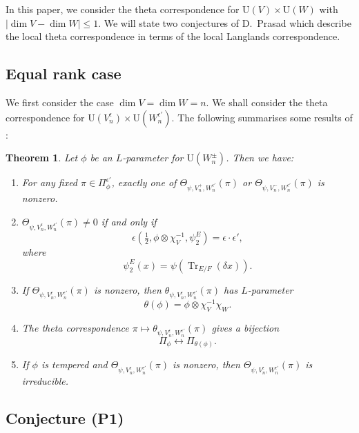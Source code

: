 \documentclass[11pt]{amsart}
\numberwithin{equation}{section}
\theoremstyle{plain}
\newtheorem{thm}{Theorem}[section]
\theoremstyle{definition}
\theoremstyle{remark}
\def\Tr{\operatorname{Tr}}
\def\U{\mathrm{U}}
\begin{document}
In this paper, we consider the theta correspondence for $\U(V) \times \U(W)$ with $|\dim V - \dim W| \le 1$. We will state two conjectures of D.~Prasad which describe the local theta correspondence in terms of the local Langlands correspondence. 

\subsection{Equal rank case} 

We first consider the case $\dim V = \dim W = n$. We shall consider the theta correspondence for $\U(V_n^\epsilon) \times \U(W_n^{\epsilon'})$.
The following summarises some results of \cite{gi}:

\begin{thm}  \label{T:equal}
Let $\phi$ be an $L$-parameter for $\U(W_n^\pm)$.
Then we have:
\begin{enumerate}
\item For any fixed $\pi \in \Pi_{\phi}^{\epsilon'}$, exactly one of $\Theta_{\psi, V_n^+,W_n^{\epsilon'}}(\pi)$ or $\Theta_{\psi, V_n^-,W_n^{\epsilon'}}(\pi)$ is nonzero.

\item $\Theta_{\psi, V_n^\epsilon, W_n^{\epsilon'}}(\pi) \ne 0$ if and only if
\[  \epsilon(\tfrac{1}{2}, \phi  \otimes  \chi_V^{-1}, \psi^E_2)  = \epsilon \cdot \epsilon', \]
where
\[  \psi^E_2(x)  = \psi(\Tr_{E/F}(\delta x)).  \]

\item If $\Theta_{\psi, V_n^{\epsilon},W_n^{\epsilon'}}(\pi)$ is nonzero, then $\theta_{\psi, V_n^{\epsilon},W_n^{\epsilon'}}(\pi)$ has $L$-parameter
\[   \theta(\phi)  =  \phi \otimes \chi_V^{-1} \chi_W. \]

\item The theta correspondence $\pi \mapsto   \theta_{\psi, V_n^{\epsilon}, W_n^{\epsilon'}}(\pi)$ gives a bijection
\[  \Pi_{\phi}  \longleftrightarrow   \Pi_{\theta(\phi)}. \]

\item If $\phi$ is tempered and $\Theta_{\psi, V_n^{\epsilon}, W_n^{\epsilon'}}(\pi)$ is nonzero, then $\Theta_{\psi, V_n^{\epsilon}, W_n^{\epsilon'}}(\pi)$ is irreducible.

\end{enumerate}
\end{thm}

\subsection{Conjecture (P1)}
\end{document}
